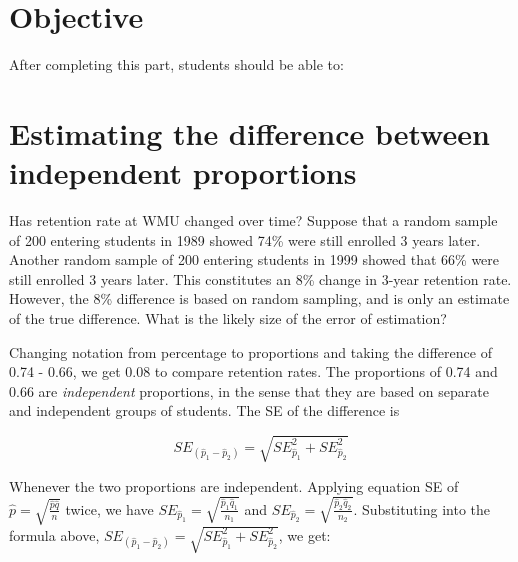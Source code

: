 \documentclass[11pt, chapterprefix=true]{scrbook}\usepackage[]{graphicx}\usepackage[]{color}
\begin{document}
\section{Objective}

After completing this part, students should be able to:


\section{Estimating the difference between independent proportions}

Has retention rate at WMU changed over time?  Suppose that a random sample of 200 entering students in 1989 showed 74\% were still enrolled 3 years later.  Another random sample of 200 entering students in 1999 showed that 66\% were still enrolled 3 years later.  This constitutes an 8\% change in 3-year retention rate.  However, the 8\% difference is based on random sampling, and is only an estimate of the true difference.  What is the likely size of the error of estimation?

Changing notation from percentage to proportions and taking the difference of
0.74 - 0.66, we get 0.08 to compare retention rates.  The proportions of 0.74 and 0.66 are \textit{independent} proportions, in the sense that they are based on separate and independent groups of students.  The SE of the difference is

\begin{equation*}
  SE_{(\hat{p}_1 - \hat{p}_2)} = \sqrt{ SE_{\hat{p}_1}^2 + SE_{\hat{p}_2}^2}
\end{equation*}

Whenever the two proportions are independent.  Applying equation SE of $\hat{p} = \sqrt{ \frac{ \hat{p} \hat{q} }{n}}$ twice, we have $SE_{\hat{p}_1} = \sqrt{ \frac{ \hat{p}_1 \hat{q}_1 }{n_1}}$ and $SE_{\hat{p}_2} = \sqrt{ \frac{ \hat{p}_2 \hat{q}_2 }{n_2}}$.  Substituting into the formula above, $SE_{(\hat{p}_1 - \hat{p}_2)} = \sqrt{ SE_{\hat{p}_1}^2 + SE_{\hat{p}_2}^2}$, we get:
\end{document}
